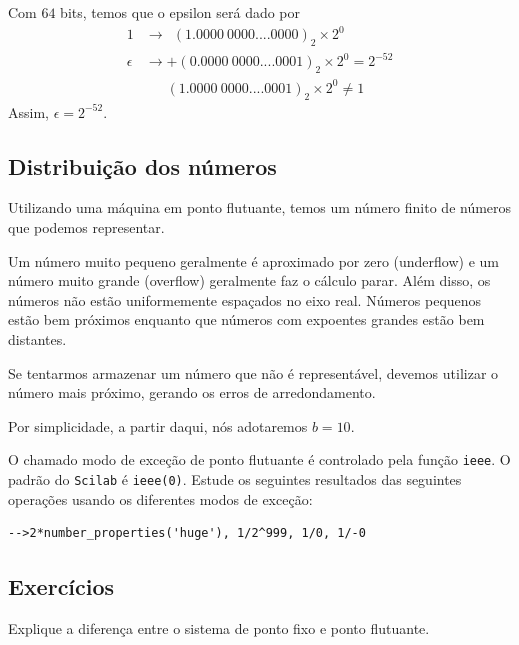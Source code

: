 \begin{ex}
  Com $64$ bits, temos que o epsilon será dado por
\begin{equation*}
  \begin{split}
  1      &\rightarrow ~~(1.0000~0000....0000)_2\times 2^{0} \\
\epsilon &\rightarrow  +(0.0000~0000....0001)_2\times 2^{0}  = 2^{-52} \\
         &      ~~~~~~~ (1.0000~0000....0001)_2\times 2^{0} \neq 1    
  \end{split}
\end{equation*}
Assim, $\epsilon = 2^{-52}$.
\end{ex}



\subsection{Distribuição dos números}
Utilizando uma máquina em ponto flutuante, temos um número finito de números que podemos representar.

Um número muito pequeno geralmente é aproximado por zero (underflow) e um número muito grande (overflow) geralmente faz o cálculo parar.
Além disso, os números não estão uniformemente espaçados no eixo real. Números pequenos estão bem próximos enquanto que números com expoentes grandes estão bem distantes.

Se tentarmos armazenar um número que não é representável, devemos utilizar o número mais próximo, gerando os erros de arredondamento.

Por simplicidade, a partir daqui, nós adotaremos $b=10$.

\ifisscilab
\begin{obs}
  O chamado modo de exceção de ponto flutuante é controlado pela função \verb+ieee+. O padrão do \verb+Scilab+ é \verb+ieee(0)+. Estude os seguintes resultados das seguintes operações usando os diferentes modos de exceção:
\begin{verbatim}
-->2*number_properties('huge'), 1/2^999, 1/0, 1/-0
\end{verbatim}
\end{obs}
\fi

\subsection*{Exercícios}

\begin{exer} Explique a diferença entre o sistema de ponto fixo e ponto flutuante.
\end{exer}

